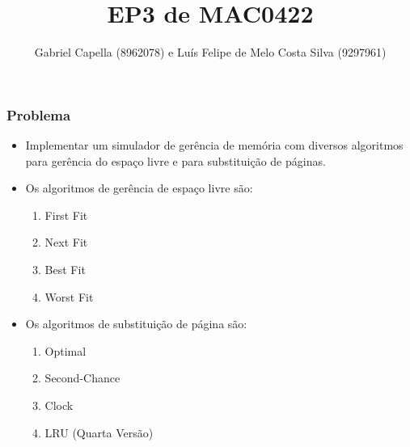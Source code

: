 \documentclass{beamer}
\title[EP3]{EP3 de MAC0422} %
\author{Gabriel Capella (8962078) e Luís Felipe de Melo Costa Silva (9297961)} %
\institute[USP] %
{
IME-USP\\ %
\medskip
}
\begin{document}
\begin{frame}
\titlepage %
\end{frame}




\begin{frame}
	\frametitle{Problema}
	\begin{itemize}
		\item Implementar um simulador de gerência de memória com diversos algoritmos para gerência do espaço livre e para substituição de páginas.
		\item Os algoritmos de gerência de espaço livre são:
		\begin{enumerate}
			\item First Fit
			\item Next Fit
			\item Best Fit
			\item Worst Fit
		\end{enumerate}
		\item Os algoritmos de substituição de página são:
		\begin{enumerate}
			\item Optimal
			\item Second-Chance
			\item Clock
			\item LRU (Quarta Versão)
		\end{enumerate}
	\end{itemize}
\end{frame}
\end{document}
